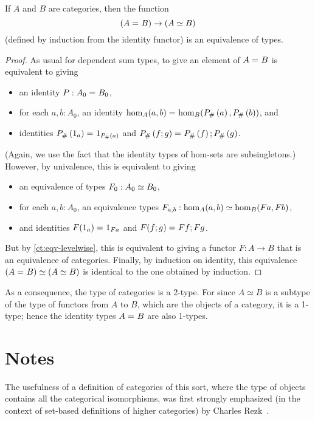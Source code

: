 \begin{thm}\label{ct:cat-2cat}
  If $A$ and $B$ are categories, then the function
  \[(A =_{} B) \to (A\simeq B)\]
  (defined by induction from the identity functor) is an equivalence of types.
\end{thm}
\begin{proof}
  As usual for dependent sum types, to give an element of $A =_{} B$ is equivalent to giving
  \begin{itemize}
  \item an identity $P:A_0 =_{} B_0$,
  \item for each $a,b:A_0$, an identity $\hom_A(a,b) =_{} \hom_B({P}_{\#}\left({a}\right),{P}_{\#}\left({b}\right))$, and
  \item identities ${P}_{\#}\left({1_a}\right) =_{} 1_{{P}_{\#}\left({a}\right)}$ and ${P}_{\#}\left({f;g}\right) =_{} {P}_{\#}\left({f}\right);{P}_{\#}\left({g}\right)$.
  \end{itemize}
  (Again, we use the fact that the identity types of hom-sets are subsingletons.)
  However, by univalence, this is equivalent to giving
  \begin{itemize}
  \item an equivalence of types $F_0:A_0 \simeq B_0$,
  \item for each $a,b:A_0$, an equivalence  types $F_{a,b}:\hom_A(a,b) \simeq \hom_B(F a,F b)$,
  \item and identities $F(1_a) =_{} 1_{Fa}$ and $F(f;g) =_{} F f;F g$.
  \end{itemize}
  But by \autoref{ct:eqv-levelwise}, this is equivalent to giving a functor $F:A\to B$ that is an equivalence of categories.  Finally, by induction on identity, this equivalence $(A =_{} B) \simeq (A\simeq B)$ is identical to the one obtained by induction.
\end{proof}

As a consequence, the type of categories is a 2-type.  For since $A\simeq B$ is a subtype of the type of functors from $A$ to $B$, which are the objects of a category, it is a 1-type; hence the identity types $A =_{} B$ are also 1-types.

\section*{Notes}
\label{sec:ct:notes}

The usefulness of a definition of categories of this sort, where the type of objects contains all the categorical isomorphisms, was first strongly emphasized (in the context of set-based definitions of higher categories) by Charles Rezk~\cite{rezk01css}.

